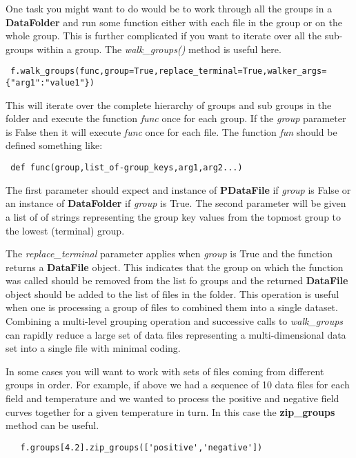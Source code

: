 \documentclass[a4paper,11pt]{scrartcl}
\begin{document}
One task you might want to do would be to work through all the groups in a \textbf{DataFolder} and run some function either with each file in the group or on the whole group. This is further complicated if you want to iterate over all the sub-groups within a group. The \textit{walk\_groups()} method is useful here.
\begin{lstlisting}
 f.walk_groups(func,group=True,replace_terminal=True,walker_args={"arg1":"value1"})
\end{lstlisting}

This will iterate over the complete hierarchy of groups and sub groups in the folder and execute the function \textit{func} once for each group. If the \textit{group} parameter is False then it will execute \textit{func} once for each file. The function \textit{fun} should be defined something like:
\begin{lstlisting}
 def func(group,list_of-group_keys,arg1,arg2...)
\end{lstlisting}
The first parameter should expect and instance of \textbf{PDataFile} if \textit{group} is False or an instance of \textbf{DataFolder} if \textit{group} is True. The second parameter will be given a list of of strings representing the group key values from the topmost group to the lowest (terminal) group.

The \textit{replace\_terminal} parameter applies when \textit{group} is True and the function returns a \textbf{DataFile} object. This indicates that the group on which the function was called should be removed from the list fo groups and the returned \textbf{DataFile} object should be added to the list of files in the folder. This operation is useful when one is processing a group of files to combined them into a single dataset. Combining a multi-level grouping operation and successive calls to \textit{walk\_groups} can rapidly reduce a large set of data files representing a multi-dimensional data set into a single file with minimal coding.


In some cases you will want to work with sets of files coming from different groups in order. For example, if above we had a sequence of 10 data files for each field and temperature and we wanted to process the positive and negative field curves together for a given temperature in turn. In this case the \textbf{zip\_groups} method can be useful.

\begin{lstlisting}
   f.groups[4.2].zip_groups(['positive','negative'])
\end{lstlisting}
\end{document}
